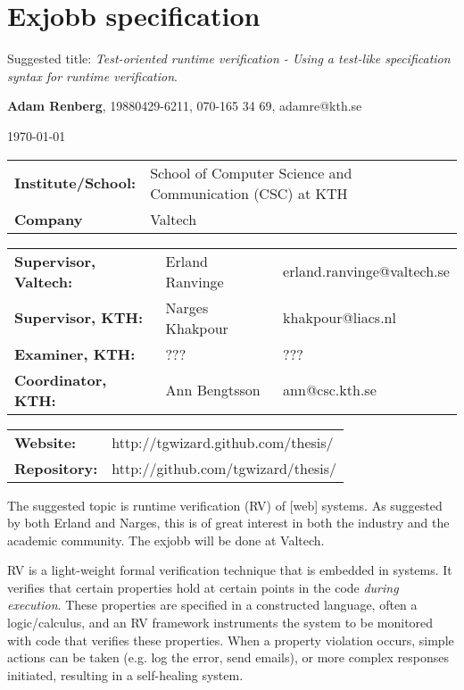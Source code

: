 \documentclass[a4paper,11pt]{kth-mag}
\begin{document}
\removepagenumbers%
\setlength\parindent{0em}
\setlength\parskip{1em}

\pagestyle{empty}


\chapter*{Exjobb specification}

Suggested title: \textit{Test-oriented runtime verification - Using a test-like specification syntax for runtime verification}.

\textbf{Adam Renberg}, 19880429-6211, 070-165 34 69, adamre@kth.se

\today

\begin{tabular}{lll}
	\textbf{Institute/School:} & School of Computer Science and Communication (CSC) at KTH \\
    \textbf{Company}           & Valtech \\
\end{tabular}

\begin{tabular}{lll}
	\textbf{Supervisor, Valtech:} & Erland Ranvinge & erland.ranvinge@valtech.se \\
    \textbf{Supervisor, KTH:}     & Narges Khakpour & khakpour@liacs.nl \\
    \textbf{Examiner, KTH:}			  & ???	& ??? \\
    \textbf{Coordinator, KTH:}	  & Ann Bengtsson & ann@csc.kth.se \\
\end{tabular}

\begin{tabular}{ll}
    \textbf{Website:} & http://tgwizard.github.com/thesis/ \\
    \textbf{Repository:} & http://github.com/tgwizard/thesis/ \\
\end{tabular}


The suggested topic is runtime verification (RV) of [web] systems. As suggested
by both Erland and Narges, this is of great interest in both the industry and
the academic community. The exjobb will be done at Valtech.

RV is a light-weight formal verification technique that is embedded in systems.
It verifies that certain properties hold at certain points in the code
\textit{during execution}. These properties are specified in a constructed
language, often a logic/calculus, and an RV framework instruments the system to
be monitored with code that verifies these properties. When a property
violation occurs, simple actions can be taken (e.g. log the error, send
emails), or more complex responses initiated, resulting in a self-healing
system.
\end{document}
